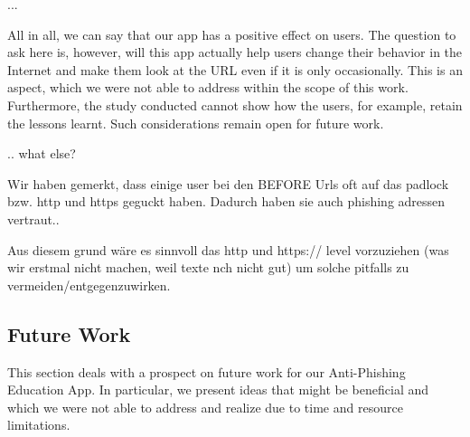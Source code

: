 ...

All in all, we can say that our app has a positive effect on users.
The question to ask here is, however, will this app actually help users change their behavior in the Internet and make them look at the URL even if it is only occasionally.
This is an aspect, which we were not able to address within the scope of this work.
Furthermore, the study conducted cannot show how the users, for example, retain the lessons learnt.
Such considerations remain open for future work.

.. what else?

Wir haben gemerkt, dass einige user bei den BEFORE Urls oft auf das padlock bzw. http und https geguckt haben. Dadurch haben sie auch phishing adressen  vertraut..

Aus diesem grund wäre es sinnvoll das http und https:// level vorzuziehen (was wir erstmal nicht machen, weil texte nch nicht gut) um solche pitfalls zu vermeiden/entgegenzuwirken.

\subsection{Future Work}
This section deals with a prospect on future work for our Anti-Phishing Education App.
 In particular, we present ideas that might be beneficial and which we were not able to address and realize due to time and resource limitations.

